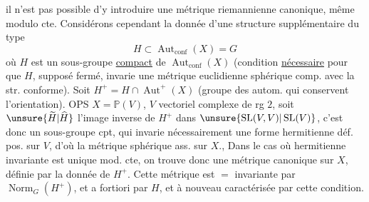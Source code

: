 il n'est pas possible d'y introduire une métrique riemannienne canonique, même modulo cte. Considérons cependant la donnée d'une structure supplémentaire du type
\[
H\subset\operatorname{Aut}_{\mathrm{conf}}(X)=G
\]
où $H$ est un sous-groupe \uline{compact} de $\operatorname{Aut}_{\mathrm{conf}}(X)$ (condition \uline{nécessaire} pour que $H$, supposé fermé, invarie une métrique euclidienne sphérique comp. avec la str. conforme). Soit $H^+=H\cap\operatorname{Aut}^+(X)$ (groupe des autom. qui conservent l'orientation). OPS $X=\mathbb P(V)$, $V$ vectoriel complexe de rg $2$,  soit $\unsure{\widetilde H|\widehat H}$ l'image inverse de $H^+$ dans $\unsure{\operatorname{SL}(V,V)|\operatorname{SL}(V)}$, c'est donc un sous-groupe cpt, qui invarie nécessairement une forme hermitienne déf. pos. sur $V$, d'où la métrique sphérique ass. sur $X$., Dans le cas où  hermitienne invariante est unique mod. cte, on trouve donc une métrique canonique sur $X$, définie par la donnée de $H^+$. Cette métrique est $=$ invariante par $\operatorname{Norm}_G(H^+)$, et a fortiori par $H$, et à nouveau caractérisée par cette condition.
